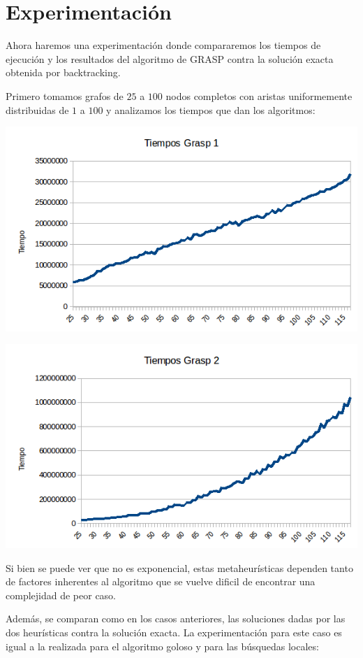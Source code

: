 \section{Experimentación}

Ahora haremos una experimentación donde compararemos los tiempos de ejecución y los resultados del algoritmo de GRASP contra la solución exacta obtenida por backtracking.

Primero tomamos grafos de $25$ a $100$ nodos completos con aristas uniformemente distribuidas de $1$ a $100$ y analizamos los tiempos que dan los algoritmos:

\includegraphics[scale=0.5]{Ej5/tiempog1.png}

\includegraphics[scale=0.5]{Ej5/tiempog2.png}

Si bien se puede ver que no es exponencial, estas metaheurísticas dependen tanto de factores inherentes al algoritmo que se vuelve dificil de encontrar una complejidad de peor caso.

Además, se comparan como en los casos anteriores, las soluciones dadas por las dos heurísticas contra la solución exacta. La experimentación para este caso es igual a la realizada para el algoritmo goloso y para las búsquedas locales:

